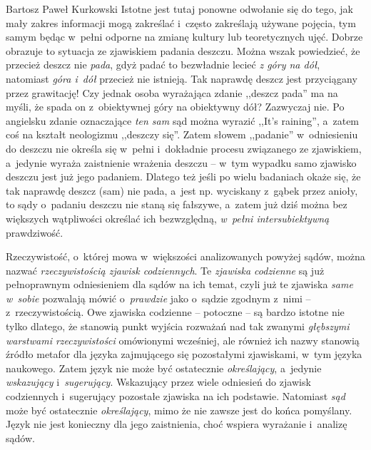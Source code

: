 \begin{artplenv}{Bartosz Paweł Kurkowski}
Istotne jest tutaj ponowne odwołanie się do tego, jak mały zakres informacji mogą zakreślać i~często zakreślają używane
pojęcia, tym samym będąc w~pełni odporne na zmianę kultury lub teoretycznych ujęć. Dobrze obrazuje to sytuacja ze
zjawiskiem padania deszczu. Można wszak powiedzieć, że przecież deszcz nie \textit{pada}, gdyż padać to bezwładnie
lecieć \textit{z góry na dół}, natomiast \textit{góra i~dół }przecież nie istnieją. Tak naprawdę deszcz jest
przyciągany przez grawitację! Czy jednak osoba wyrażająca zdanie ,,deszcz pada'' ma na myśli, że spada on z~obiektywnej
góry na obiektywny dół? Zazwyczaj nie. Po angielsku zdanie oznaczające \textit{ten sam }sąd można wyrazić ,,It’s
raining'', a~zatem coś na kształt neologizmu ,,deszczy się''. Zatem słowem ,,padanie'' w~odniesieniu do deszczu nie określa
się w~pełni i~dokładnie procesu związanego ze zjawiskiem, a~jedynie wyraża zaistnienie wrażenia deszczu -- w~tym wypadku
samo zjawisko deszczu jest już jego padaniem. Dlatego też jeśli po wielu badaniach okaże się, że tak naprawdę deszcz
(sam) nie pada, a~jest np. wyciskany z~gąbek przez anioły, to sądy o~padaniu deszczu nie staną się fałszywe, a~zatem
już dziś można bez większych wątpliwości określać ich bezwzględną, \textit{w~pełni intersubiektywną} prawdziwość.


Rzeczywistość, o~której mowa w~większości analizowanych powyżej sądów, można nazwać \textit{rzeczywistością zjawisk
codziennych}. Te \textit{zjawiska codzienne} są już pełnoprawnym odniesieniem dla sądów na ich temat, czyli już te
zjawiska \textit{same w~sobie} pozwalają mówić o~\textit{prawdzie} jako o~sądzie zgodnym z~nimi -- z~rzeczywistością.
Owe zjawiska codzienne -- potoczne -- są bardzo istotne nie tylko dlatego, że stanowią punkt wyjścia rozważań nad tak
zwanymi \textit{głębszymi warstwami rzeczywistości} omówionymi wcześniej, ale również ich nazwy stanowią źródło metafor
dla języka zajmującego się pozostałymi zjawiskami, w~tym języka naukowego. Zatem język nie może być ostatecznie
\textit{określający}, a~jedynie \textit{wskazujący }i~\textit{sugerujący}. Wskazujący przez wiele odniesień do zjawisk
codziennych i~sugerujący pozostałe zjawiska na ich podstawie. Natomiast \textit{sąd} może być ostatecznie
\textit{określający}, mimo że nie zawsze jest do końca pomyślany. Język nie jest konieczny dla jego zaistnienia, choć
wspiera wyrażanie i~analizę sądów.



\end{artplenv}
